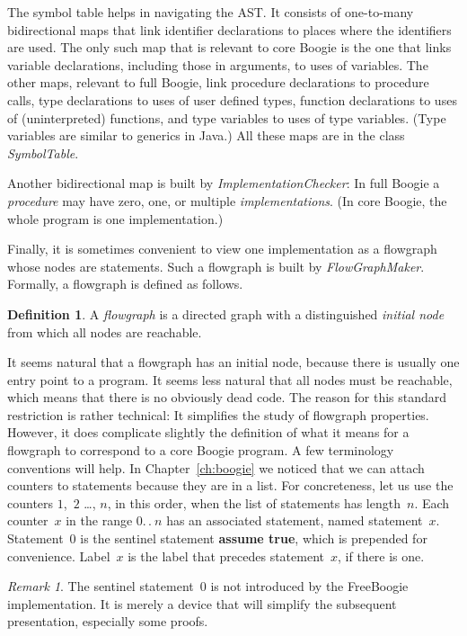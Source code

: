 \documentclass[a4paper]{article}
\theoremstyle{slanted}
\theoremstyle{definition}
\newtheorem{definition}{Definition}
\theoremstyle{remark}
\newtheorem{remark}{Remark}
\begin{document}
The symbol table helps in navigating the AST\null. It consists of
one-to-many bidirectional maps that link identifier declarations
to places where the identifiers are used. The only such
map that is relevant to core Boogie is the one that links
variable declarations, including those in arguments, to uses
of variables. The other maps, relevant to full Boogie, link
procedure declarations to procedure calls, type declarations to
uses of user defined types, function declarations to uses of
(uninterpreted) functions, and type variables to uses of type
variables. (Type variables are similar to generics in Java.) All
these maps are in the class \textit{SymbolTable}.

Another bidirectional map is built by
\textit{ImplementationChecker}: In full Boogie a \emph{procedure}
may have zero, one, or multiple \emph{implementations}. (In core
Boogie, the whole program is one implementation.)

Finally, it is sometimes convenient to view one implementation as
a flowgraph whose nodes are statements. Such a flowgraph is built
by \textit{FlowGraphMaker}. Formally, a flowgraph is defined as
follows.

\begin{definition}
A \emph{flowgraph} is a directed graph with a distinguished
\emph{initial node} from which all nodes are reachable.
\end{definition}

It seems natural that a flowgraph has an initial node, because
there is usually one entry point to a program. It seems less
natural that all nodes must be reachable, which means that
there is no obviously dead code. The reason for this standard
restriction is rather technical: It simplifies the study of
flowgraph properties. However, it does complicate slightly the
definition of what it means for a flowgraph to correspond to a
core Boogie program. A few terminology conventions will help. In
Chapter~\ref{ch:boogie} we noticed that we can attach counters
to statements because they are in a list. For concreteness, let
us use the counters $1$,~$2$ \dots, $n$, in this order, when the
list of statements has length~$n$. Each counter~$x$ in the range
$0.\,.\>n$ has an associated statement, named statement~$x$.
Statement~$0$ is the sentinel statement \textbf{assume true},
which is prepended for convenience. Label~$x$ is the label that
precedes statement~$x$, if there is one.

\begin{remark}
The sentinel statement~$0$ is not introduced by the FreeBoogie
implementation. It is merely a device that will simplify the
subsequent presentation, especially some proofs.
\end{remark}
\end{document}
